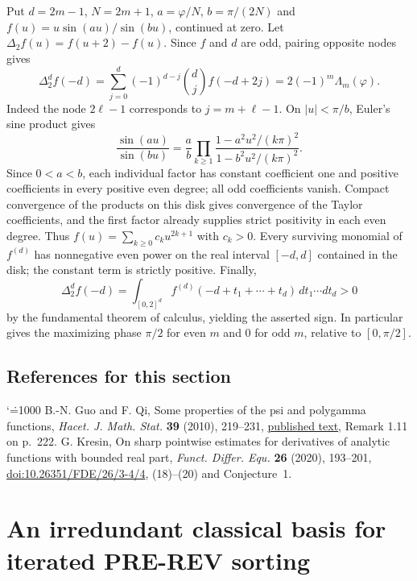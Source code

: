 \documentclass[11pt,a4paper]{article}
\makeatletter
\numberwithin{equation}{section}
\theoremstyle{definition}
\theoremstyle{remark}
\renewenvironment{thebibliography}[1]
 {\subsection*{References for this section}\small
  \list{\@biblabel{\@arabic\c@enumiv}}
       {\settowidth\labelwidth{\@biblabel{#1}}\leftmargin\labelwidth
        \advance\leftmargin\labelsep\@openbib@code
        \usecounter{enumiv}\let\p@enumiv\@empty
        \renewcommand\theenumiv{\@arabic\c@enumiv}}
  \sloppy\clubpenalty4000\widowpenalty4000\sfcode`\.=1000\relax}
 {\def\@noitemerr{\@latex@warning{Empty bibliography}}\endlist}
\makeatother
\begin{document}
Put $d=2m-1$, $N=2m+1$, $a=\varphi/N$, $b=\pi/(2N)$ and $f(u)=u\sin(au)/\sin(bu)$, continued at zero. Let $\Delta_2f(u)=f(u+2)-f(u)$. Since $f$ and $d$ are odd, pairing opposite nodes gives
\[
 \Delta_2^d f(-d)=\sum_{j=0}^d(-1)^{d-j}\binom dj f(-d+2j)
                 =2(-1)^m\Lambda_m(\varphi).
\]
Indeed the node $2\ell-1$ corresponds to $j=m+\ell-1$. On $|u|<\pi/b$, Euler's sine product gives
\[
 \frac{\sin(au)}{\sin(bu)}
 =\frac ab\prod_{k\ge1}\frac{1-a^2u^2/(k\pi)^2}{1-b^2u^2/(k\pi)^2}.
\]
Since $0<a<b$, each individual factor has constant coefficient one and positive coefficients in every positive even degree; all odd coefficients vanish. Compact convergence of the products on this disk gives convergence of the Taylor coefficients, and the first factor already supplies strict positivity in each even degree. Thus $f(u)=\sum_{k\ge0}c_k u^{2k+1}$ with $c_k>0$. Every surviving monomial of $f^{(d)}$ has nonnegative even power on the real interval $[-d,d]$ contained in the disk; the constant term is strictly positive. Finally,
\[
 \Delta_2^d f(-d)=\int_{[0,2]^d} f^{(d)}(-d+t_1+\cdots+t_d)\,dt_1\cdots dt_d>0
\]
by the fundamental theorem of calculus, yielding the asserted sign. In particular \cite[(18)--(20)]{r33heisei:Kr} gives the maximizing phase $\pi/2$ for even $m$ and $0$ for odd $m$, relative to $[0,\pi/2]$.

\begin{thebibliography}{9}
 B.-N. Guo and F. Qi, Some properties of the psi and polygamma functions, \emph{Hacet. J. Math. Stat.} \textbf{39} (2010), 219--231, \href{https://dergipark.org.tr/en/download/article-file/86737}{published text}, Remark 1.11 on p.~222.
 G. Kresin, On sharp pointwise estimates for derivatives of analytic functions with bounded real part, \emph{Funct. Differ. Equ.} \textbf{26} (2020), 193--201, \href{https://doi.org/10.26351/FDE/26/3-4/4}{doi:10.26351/FDE/26/3-4/4}, (18)--(20) and Conjecture~1.
\end{thebibliography}

\par\endgroup

\begingroup
\newcommand{\pr}{\mathcal P}
\newcommand{\av}{\operatorname{Av}}
\section{\texorpdfstring{An irredundant classical basis for iterated PRE-REV sorting}{An irredundant classical basis for iterated PRE-REV sorting}}\label{section:r33reiwa}
\par\medskip
\end{document}
